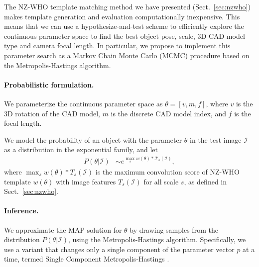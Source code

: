 The NZ-WHO template matching method we have presented
(Sect.~\ref{sec:nzwho}) makes template generation and evaluation
computationally inexpensive. This means that we can use a
hypothesize-and-test scheme to efficiently explore the continuous
parameter space to find the best object pose, scale, 3D CAD model type
and camera focal length.
%
In particular, we propose to implement this parameter search as a
Markov Chain Monte Carlo (MCMC) procedure based on the
Metropolis-Hastings algorithm.

\paragraph{Probabilistic formulation.}
We parameterize the continuous parameter space as  $\theta = [v, m, f]$,
where $v$ is the 3D rotation of the CAD model, $m$ is the discrete CAD
model index, and $f$ is the focal length.

We model the probability of an object with the parameter $\theta$ in the test
image $\mathcal{I}$ as a distribution in the exponential family, and let
\begin{align}
    P(\theta| \mathcal{I}) & \sim e^{ \max_{s} w(\theta) \ast \mathcal{T}_s(\mathcal{I})},
\end{align}
where $\max_{s} w(\theta) \ast T_s(\mathcal{I})$ is the maximum convolution score of
NZ-WHO template $w(\theta)$ with image features $T_s(\mathcal{I})$ for all scale
$s$, as defined in Sect.~\ref{sec:nzwho}.

\paragraph{Inference.}
We approximate the MAP solution for $\theta$ by drawing samples from the
distribution $P(\theta | \mathcal{I})$, using the Metropolis-Hastings
algorithm. Specifically, we use a variant that changes only a single
component of the parameter vector $p$ at a time, termed Single
Component Metropolis-Hastings \cite{mcmc}.


